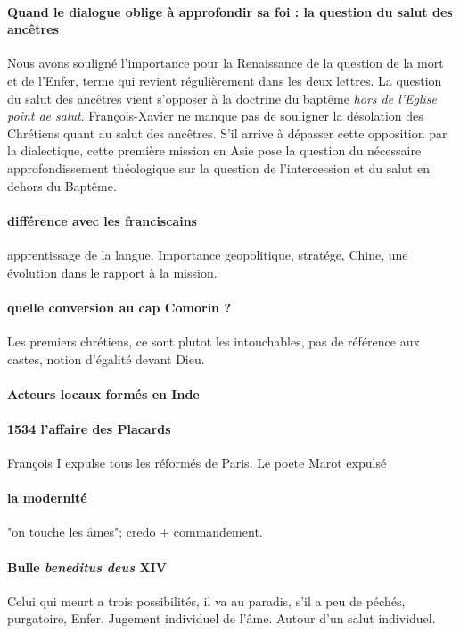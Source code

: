 \paragraph{Quand le dialogue oblige à approfondir sa foi : la question du salut des ancêtres} Nous avons souligné l'importance pour la Renaissance de la question de la mort et de l'Enfer, terme qui revient régulièrement dans les deux lettres.  La question du salut des ancêtres vient s'opposer à la doctrine du baptême \textit{hors de l'Eglise point de salut}. François-Xavier ne manque pas de souligner la désolation des Chrétiens quant au salut des ancêtres. S'il arrive à dépasser cette opposition par la dialectique, cette première mission en Asie pose la question du nécessaire approfondissement théologique sur la question de l'intercession et du salut en dehors du Baptême.  


\paragraph{différence avec les franciscains} apprentissage de la langue. Importance geopolitique, stratége, Chine, une évolution dans le rapport à la mission.

\paragraph{quelle conversion au cap Comorin ?} Les premiers chrétiens, ce sont plutot les intouchables, pas de référence aux castes, notion d'égalité devant Dieu. 

\paragraph{Acteurs locaux formés en Inde}

\paragraph{1534 l'affaire des Placards } François I expulse tous les réformés de Paris.  Le poete Marot expulsé

\paragraph{la modernité} "on touche les âmes"; credo + commandement. 

\paragraph{Bulle \textit{beneditus deus} XIV} Celui qui meurt a trois possibilités, il va au paradis, s'il a peu de péchés, purgatoire, Enfer. Jugement individuel de l'âme. Autour d'un salut individuel. 


